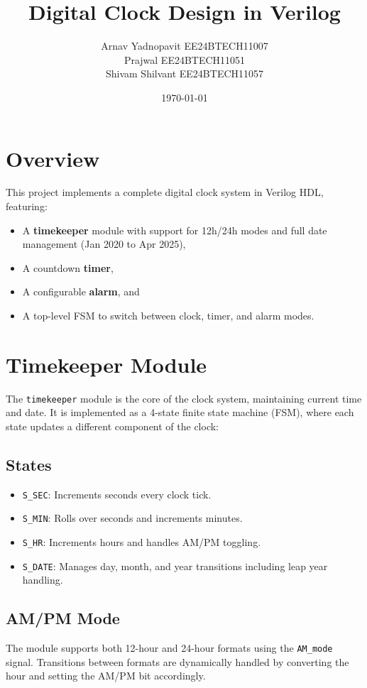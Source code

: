 \documentclass[11pt]{article}
\title{\textbf{Digital Clock Design in Verilog}}
\author{Arnav Yadnopavit EE24BTECH11007\\Prajwal EE24BTECH11051\\Shivam Shilvant EE24BTECH11057}
\date{\today}
\begin{document}
\maketitle

\section{Overview}
This project implements a complete digital clock system in Verilog HDL, featuring:
\begin{itemize}
  \item A \textbf{timekeeper} module with support for 12h/24h modes and full date management (Jan 2020 to Apr 2025),
  \item A countdown \textbf{timer},
  \item A configurable \textbf{alarm}, and
  \item A top-level FSM to switch between clock, timer, and alarm modes.
\end{itemize}

\section{Timekeeper Module}
The \texttt{timekeeper} module is the core of the clock system, maintaining current time and date. It is implemented as a 4-state finite state machine (FSM), where each state updates a different component of the clock:

\subsection{States}
\begin{itemize}
  \item \texttt{S\_SEC}: Increments seconds every clock tick.
  \item \texttt{S\_MIN}: Rolls over seconds and increments minutes.
  \item \texttt{S\_HR}: Increments hours and handles AM/PM toggling.
  \item \texttt{S\_DATE}: Manages day, month, and year transitions including leap year handling.
\end{itemize}

\subsection{AM/PM Mode}
The module supports both 12-hour and 24-hour formats using the \texttt{AM\_mode} signal. Transitions between formats are dynamically handled by converting the hour and setting the AM/PM bit accordingly.
\end{document}
